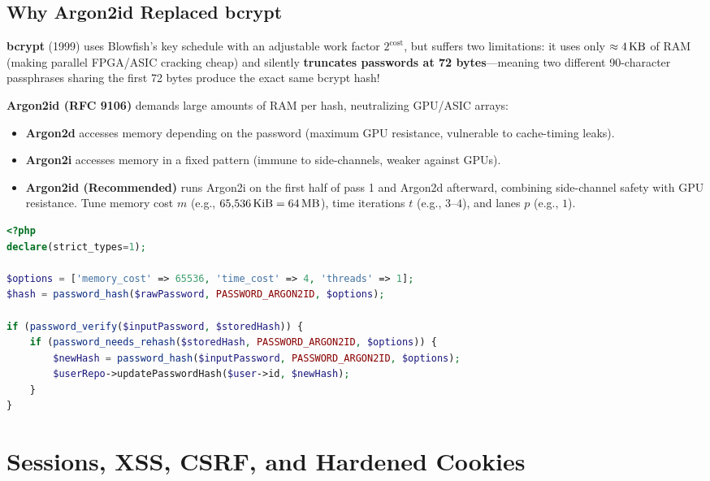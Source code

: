 \subsection{Why Argon2id Replaced bcrypt}

\textbf{bcrypt} (1999) uses Blowfish's key schedule with an adjustable work factor $2^{\text{cost}}$, but suffers two limitations: it uses only $\approx 4\text{\,KB}$ of RAM (making parallel FPGA/ASIC cracking cheap) and silently \textbf{truncates passwords at 72 bytes}---meaning two different 90-character passphrases sharing the first 72 bytes produce the exact same bcrypt hash!

\textbf{Argon2id (RFC 9106)} demands large amounts of RAM per hash, neutralizing GPU/ASIC arrays:
\begin{itemize}[leftmargin=15pt]
  \item \textbf{Argon2d} accesses memory depending on the password (maximum GPU resistance, vulnerable to cache-timing leaks).
  \item \textbf{Argon2i} accesses memory in a fixed pattern (immune to side-channels, weaker against GPUs).
  \item \textbf{Argon2id (Recommended)} runs Argon2i on the first half of pass 1 and Argon2d afterward, combining side-channel safety with GPU resistance. Tune memory cost $m$ (e.g., $65{,}536\text{\,KiB} = 64\text{\,MB}$), time iterations $t$ (e.g., $3\text{--}4$), and lanes $p$ (e.g., $1$).
\end{itemize}

\begin{lstlisting}[language=PHP,caption={Argon2id Hashing and Transparent Re-Hashing in PHP 8.3}]
<?php
declare(strict_types=1);

$options = ['memory_cost' => 65536, 'time_cost' => 4, 'threads' => 1];
$hash = password_hash($rawPassword, PASSWORD_ARGON2ID, $options);

if (password_verify($inputPassword, $storedHash)) {
    if (password_needs_rehash($storedHash, PASSWORD_ARGON2ID, $options)) {
        $newHash = password_hash($inputPassword, PASSWORD_ARGON2ID, $options);
        $userRepo->updatePasswordHash($user->id, $newHash);
    }
}
\end{lstlisting}

\section{Sessions, XSS, CSRF, and Hardened Cookies}

